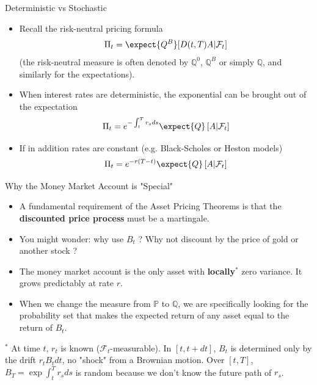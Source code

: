 \documentclass{beamer}
\begin{document}
\begin{frame}{Deterministic vs Stochastic}
	\begin{itemize}
		\item<0-> Recall the risk-neutral pricing formula
		\begin{equation*}
			\Pi_t = \expect{Q^B}[D(t,T)A|\mathcal{F}_t]
		\end{equation*}
		(the risk-neutral measure is often denoted by $\mathbb{Q}^0$, $\mathbb{Q}^B$ or simply $\mathbb{Q}$, and similarly for the expectations).
		\item<1-> When \textcolor{maincolor}{interest rates are deterministic}, the exponential can be brought out of the expectation
		\begin{equation*}
			\Pi_t = e^{-\int_t^T r_s ds} \expect{Q}\left[A|\mathcal{F}_t\right]
		\end{equation*}
		\item<2-> If in addition \textcolor{maincolor}{rates are constant} (e.g. Black-Scholes or Heston models)
		\begin{equation*}
			\Pi_t = e^{-r(T-t)}\expect{Q}\left[A|\mathcal{F}_t\right]
		\end{equation*}
	\end{itemize}
\end{frame}

\begin{frame}{Why the Money Market Account is "Special"}
	\begin{itemize}
		\item A fundamental requirement of the Asset Pricing Theorems is that the \textbf{discounted price process} must be a martingale. %
		\item You might wonder: why use $B_t$ ? Why not discount by the price of gold or another stock ?
		\item The money market account is the only asset with \textbf{locally}$^{*}$ zero variance. It grows predictably at rate $r$. %
		\item When we change the measure from $\mathbb{P}$ to $\mathbb{Q}$, we are specifically looking for the probability set that makes the expected return of any asset equal to the return of $B_t$.
	\end{itemize}
	\vfill
	\begin{tcolorbox}[colback=gray!5, colframe=maincolor, arc=0mm, boxrule=0.5pt]
		\footnotesize
		 $^{*}$ At time $t$, $r_t$ is known ($\mathcal{F}_t$-measurable). In $[t, t+dt]$, $B_t$ is determined only by the drift $r_t B_t dt$, no "shock" from a Brownian motion. Over $[t,T]$, $B_T=\exp{\int_t^T r_s ds}$ is random because we don't know the future path of $r_s$.
	\end{tcolorbox}
\end{frame}
\end{document}
